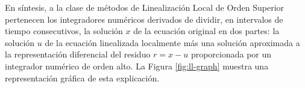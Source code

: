 En síntesis, a la clase de métodos de Linealización Local de Orden Superior pertenecen los integradores numéricos derivados de dividir, en intervalos de tiempo consecutivos, la solución $x$ de la ecuación original en dos partes: la solución $u$ de la ecuación linealizada localmente más una solución aproximada a la representación diferencial del residuo $r = x-u$ proporcionada por un integrador numérico de orden alto. La Figura \ref{fig:ll-graph} muestra una representación gráfica de esta explicación. 



